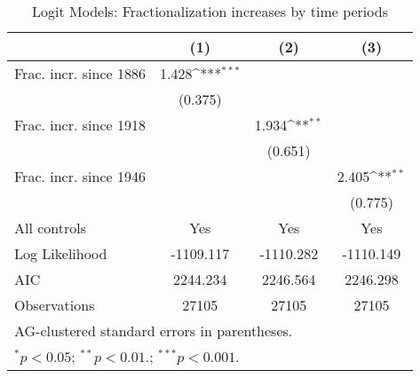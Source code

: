 \begin{table}[htbp]\centering
\def\sym#1{\ifmmode^{#1}\else\(^{#1}\)\fi}
\caption{Logit Models: Fractionalization increases by time periods \label{tab:rob:prd}}
\begin{tabular}{l*{3}{c}}
\hline\hline
                    &\multicolumn{1}{c}{(1)}         &\multicolumn{1}{c}{(2)}         &\multicolumn{1}{c}{(3)}         \\
\hline
Frac. incr. since 1886&       1.428\sym{***}&                     &                     \\
                    &     (0.375)         &                     &                     \\
Frac. incr. since 1918&                     &       1.934\sym{**} &                     \\
                    &                     &     (0.651)         &                     \\
Frac. incr. since 1946&                     &                     &       2.405\sym{**} \\
                    &                     &                     &     (0.775)         \\
\hline
All controls        &         Yes         &         Yes         &         Yes         \\
Log Likelihood      &   -1109.117         &   -1110.282         &   -1110.149         \\
AIC                 &    2244.234         &    2246.564         &    2246.298         \\
Observations        &       27105         &       27105         &       27105         \\
\hline\hline
\multicolumn{4}{l}{\footnotesize AG-clustered standard errors in parentheses.}\\
\multicolumn{4}{l}{\footnotesize $^{*}p<0.05$; $^{**}p<0.01.$; $^{***}p<0.001.$ }\\
\end{tabular}
\end{table}
